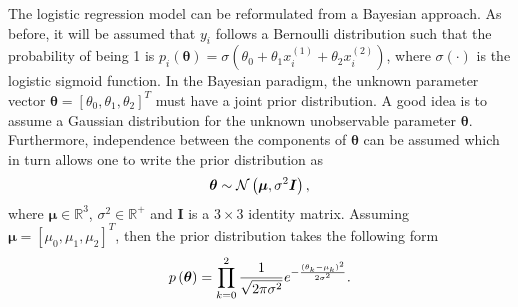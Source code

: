 The logistic regression model can be reformulated from a Bayesian approach. As before, it will be assumed that $y_i$ follows a Bernoulli distribution such that the probability of being 1 is $p_i(\boldsymbol{\theta}) = \sigma(\theta_0 + \theta_1 x_i^{(1)} + \theta_2 x_i^{(2)})$, where $\sigma \left( \cdot \right)$ is the logistic sigmoid function. In the Bayesian paradigm, the unknown parameter vector $\boldsymbol{\boldsymbol{\theta}} = \left[ \theta_0, \theta_1, \theta_2 \right]^T$ must have a joint prior distribution. A good idea is to assume a Gaussian distribution for the unknown unobservable parameter $\boldsymbol{\boldsymbol{\theta}}$. Furthermore, independence between the components of $\boldsymbol{\boldsymbol{\theta}}$ can be assumed which in turn allows one to write the prior distribution as
\begin{equation}
  \boldsymbol{\theta} \sim \mathcal{N}\left( \boldsymbol{\mu}, \sigma^2 \boldsymbol{I} \right),
\end{equation}
where $\boldsymbol{\mu} \in \mathbb{R}^3$, $\sigma^2 \in \mathbb{R}^+$ and $\boldsymbol{I}$ is a $3 \times 3$ identity matrix.
Assuming $\boldsymbol{\mu} = \left[ \mu_0, \mu_1, \mu_2 \right]^T$, then the prior distribution takes the following form
\begin{equation}
  p\left( \boldsymbol{\theta} \right) = \prod_{k = 0}^2 \frac{1}{\sqrt{2 \pi \sigma^2}} e^{- \frac{(\theta_k - \mu_k)^2}{2\sigma^2}}.
\end{equation}

